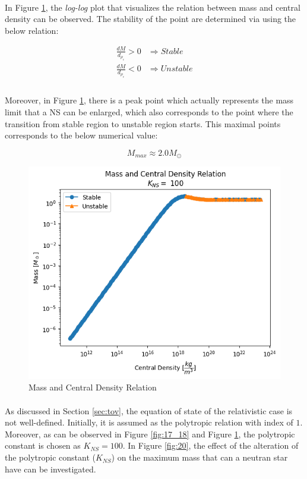 \documentclass[letterpaper,12pt]{article}
\begin{document}
\paragraph{} In Figure \ref{fig:19}, the \textit{log-log} plot that visualizes the relation between mass and central density can be observed. The stability of the point are determined via using the below relation:

\begin{align*}
    \frac{dM}{d_{\rho_c}} > 0 &\Rightarrow Stable \\
    \frac{dM}{d_{\rho_c}} < 0 &\Rightarrow Unstable \\
\end{align*}

\paragraph{} Moreover, in Figure \ref{fig:19}, there is a peak point which actually represents the mass limit that a NS can be enlarged, which also corresponds to the point where the transition from stable region to unstable region starts. This maximal points corresponds to the below numerical value:

\begin{equation*}
    M_{max} \approx 2.0 M_\odot
\end{equation*}

\begin{figure}[H] 
\centering \includegraphics[width=0.7\columnwidth]{figures/19_e_ll_m_rho.png}           
\caption{Mass and Central Density Relation}                
\label{fig:19}
\end{figure}

\paragraph{} As discussed in Section \ref{sec:tov}, the equation of state of the relativistic case is not well-defined. Initially, it is assumed as the polytropic relation with index of $1$. Moreover, as can be observed in Figure \ref{fig:17_18} and Figure \ref{fig:19}, the polytropic constant is chosen as $K_{NS} = 100$. In Figure \ref{fig:20}, the effect of the alteration of the polytropic constant ($K_{NS}$) on the maximum mass that can a neutran star have can be investigated.
\end{document}
